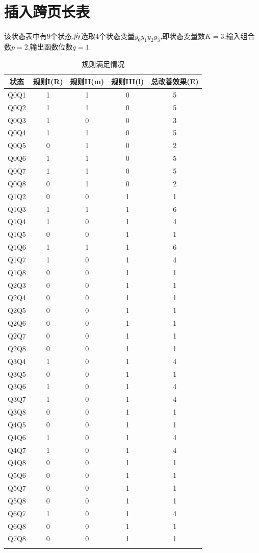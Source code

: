 \documentclass[
	12pt, %
	cn, %
]{mwhw2}
\begin{document}
\section*{插入跨页长表}
该状态表中有$9$个状态,应选取$4$个状态变量$y_0y_1y_2y_3$,即状态变量数$K=3$,输入组合数$p=2$,输出函数位数$q=1$.
\begin{longtable}[c]{@{}ccccc@{}}
\toprule
状态 & 规则I(R) & 规则II(m) & 规则III(l) & 总改善效果(E) \\* \midrule
\endhead
%
\bottomrule
\endfoot
%
\endlastfoot
%
Q0Q1 & 1 & 1 & 0 & 5 \\
Q0Q2 & 1 & 1 & 0 & 5 \\
Q0Q3 & 1 & 0 & 0 & 3 \\
Q0Q4 & 1 & 1 & 0 & 5 \\
Q0Q5 & 0 & 1 & 0 & 2 \\
Q0Q6 & 1 & 1 & 0 & 5 \\
Q0Q7 & 1 & 1 & 0 & 5 \\
Q0Q8 & 0 & 1 & 0 & 2 \\
Q1Q2 & 0 & 0 & 1 & 1 \\
Q1Q3 & 1 & 1 & 1 & 6 \\
Q1Q4 & 1 & 0 & 1 & 4 \\
Q1Q5 & 0 & 0 & 1 & 1 \\
Q1Q6 & 1 & 1 & 1 & 6 \\
Q1Q7 & 1 & 0 & 1 & 4 \\
Q1Q8 & 0 & 0 & 1 & 1 \\
Q2Q3 & 0 & 0 & 1 & 1 \\
Q2Q4 & 0 & 0 & 1 & 1 \\
Q2Q5 & 0 & 0 & 1 & 1 \\
Q2Q6 & 0 & 0 & 1 & 1 \\
Q2Q7 & 0 & 0 & 1 & 1 \\
Q2Q8 & 0 & 0 & 1 & 1 \\
Q3Q4 & 1 & 0 & 1 & 4 \\
Q3Q5 & 0 & 0 & 1 & 1 \\
Q3Q6 & 1 & 0 & 1 & 4 \\
Q3Q7 & 1 & 0 & 1 & 4 \\
Q3Q8 & 0 & 0 & 1 & 1 \\
Q4Q5 & 0 & 0 & 1 & 1 \\
Q4Q6 & 1 & 0 & 1 & 4 \\
Q4Q7 & 1 & 0 & 1 & 4 \\
Q4Q8 & 0 & 0 & 1 & 1 \\
Q5Q6 & 0 & 0 & 1 & 1 \\
Q5Q7 & 0 & 0 & 1 & 1 \\
Q5Q8 & 0 & 0 & 1 & 1 \\
Q6Q7 & 1 & 0 & 1 & 4 \\
Q6Q8 & 0 & 0 & 1 & 1 \\
Q7Q8 & 0 & 0 & 1 & 1 \\* \bottomrule
\caption{规则满足情况}
\label{tab:3}\\
\end{longtable}
\end{document}

